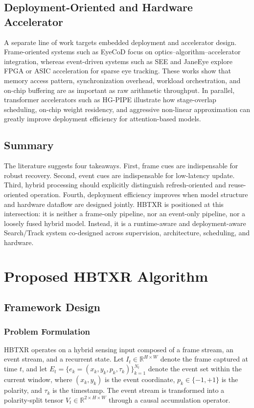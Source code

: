 \documentclass[journal]{IEEEtran}
\begin{document}
\subsection{Deployment-Oriented and Hardware Accelerator}
A separate line of work targets embedded deployment and accelerator design. Frame-oriented systems such as EyeCoD focus on optics--algorithm--accelerator integration, whereas event-driven systems such as SEE and JaneEye explore FPGA or ASIC acceleration for sparse eye tracking. These works show that memory access pattern, synchronization overhead, workload orchestration, and on-chip buffering are as important as raw arithmetic throughput. In parallel, transformer accelerators such as HG-PIPE illustrate how stage-overlap scheduling, on-chip weight residency, and aggressive non-linear approximation can greatly improve deployment efficiency for attention-based models.

\subsection{Summary}
The literature suggests four takeaways. First, frame cues are indispensable for robust recovery. Second, event cues are indispensable for low-latency update. Third, hybrid processing should explicitly distinguish refresh-oriented and reuse-oriented operation. Fourth, deployment efficiency improves when model structure and hardware dataflow are designed jointly. HBTXR is positioned at this intersection: it is neither a frame-only pipeline, nor an event-only pipeline, nor a loosely fused hybrid model. Instead, it is a runtime-aware and deployment-aware Search/Track system co-designed across supervision, architecture, scheduling, and hardware.

\section{Proposed HBTXR Algorithm}
\subsection{Framework Design}
\subsubsection{Problem Formulation}
HBTXR operates on a hybrid sensing input composed of a frame stream, an event stream, and a recurrent state. Let $I_t \in \mathbb{R}^{H\times W}$ denote the frame captured at time $t$, and let $E_t = \{e_k=(x_k,y_k,p_k,\tau_k)\}_{k=1}^{N_t}$ denote the event set within the current window, where $(x_k,y_k)$ is the event coordinate, $p_k \in \{-1,+1\}$ is the polarity, and $\tau_k$ is the timestamp. The event stream is transformed into a polarity-split tensor $V_t \in \mathbb{R}^{2\times H\times W}$ through a causal accumulation operator.
\end{document}
